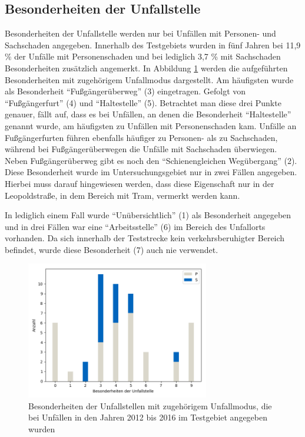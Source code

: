 \subsection{Besonderheiten der Unfallstelle}
Besonderheiten der Unfallstelle werden nur bei Unfällen mit Personen- und Sachschaden angegeben. Innerhalb des Testgebiets wurden in fünf Jahren bei 11,9 \% der Unfälle mit Personenschaden und bei lediglich 3,7 \% mit Sachschaden Besonderheiten zusätzlich angemerkt. In Abbildung \ref{fig:BES} werden die aufgeführten Besonderheiten mit zugehörigem Unfallmodus dargestellt. Am häufigsten wurde als Besonderheit \enquote{Fußgängerüberweg} (3) eingetragen. Gefolgt von \enquote{Fußgängerfurt} (4) und \enquote{Haltestelle} (5). Betrachtet man diese drei Punkte genauer, fällt auf, dass es bei Unfällen, an denen die Besonderheit \enquote{Haltestelle} genannt wurde, am häufigsten zu Unfällen mit Personenschaden kam. Unfälle an Fußgängerfurten führen ebenfalls häufiger zu Personen- als zu Sachschaden, während bei Fußgängerüberwegen die Unfälle mit Sachschaden überwiegen. Neben Fußgängerüberweg gibt es noch den \enquote{Schienengleichen Wegübergang} (2). Diese Besonderheit wurde im Untersuchungsgebiet nur in zwei Fällen angegeben. Hierbei muss darauf hingewiesen werden, dass diese Eigenschaft nur in der Leopoldstraße, in dem Bereich mit Tram, vermerkt werden kann.

In lediglich einem Fall wurde \enquote{Unübersichtlich} (1) als Besonderheit angegeben und in drei Fällen war eine \enquote{Arbeitsstelle} (6) im Bereich des Unfallorts vorhanden. Da sich innerhalb der Teststrecke kein verkehrsberuhigter Bereich befindet, wurde diese Besonderheit (7) auch nie verwendet. 

\begin{savenotes}
	\begin{figure}[H]
		\centering
		\includegraphics[width=8cm,height=6cm]{figures/BES}
		\caption[Besonderheiten der Unfallstelle mit zugehörigem Unfallmodus, die bei Unfällen in den Jahren 2012 bis 2016 im Testgebiet angegeben wurden]{Besonderheiten der Unfallstellen mit zugehörigem Unfallmodus, die bei Unfällen in den Jahren 2012 bis 2016 im Testgebiet angegeben wurden}\label{fig:BES}
	\end{figure}
\end{savenotes}

